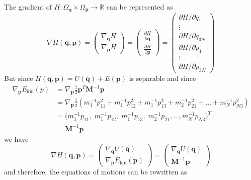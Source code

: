     The gradient of $H: \Omega_\mathbf{q} \times \Omega_\mathbf{p} \to \mathbb{R}$ can be represented as 
    \begin{equation}
      \nabla H(\mathbf{q}, \mathbf{p}) = 
      \begin{pmatrix} \nabla_\mathbf{q} H \\[1mm] \nabla_\mathbf{p} H \end{pmatrix} =
      \begin{pmatrix} \frac{\partial H}{\partial \mathbf{q}} \\[2mm] \frac{\partial H}{\partial \mathbf{p}} \end{pmatrix} = 
      \begin{pmatrix} \partial H / \partial q_1 \\ \vdots \\ \partial H / \partial q_{3N} \\ \partial H / \partial p_1 \\ \vdots \\ \partial H / \partial p_{3N} \end{pmatrix}
    \end{equation}
    But since $H(\mathbf{q}, \mathbf{p}) = U(\mathbf{q}) + E (\mathbf{p})$ is separable and since 
    \begin{align*}
      \nabla_\mathbf{p} E_\mathrm{kin}(p) & = \nabla_\mathbf{p} \frac{1}{2} \mathbf{p}^T \mathbf{M}^{-1} \mathbf{p} \\
      & = \nabla_\mathbf{p} \frac{1}{2} (m_1^{-1} p_{11}^2 + m_1^{-1} p_{12}^2 + m_1^{-1} p_{13}^2 + m_2^{-1} p_{21}^2 + \ldots + m_N^{-1} p_{N3}^2) \\
      & = \big(m_1^{-1} p_{11}, \;m_1^{-1} p_{12}, \;m_1^{-1} p_{13}, \;m_2^{-1} p_{21}, \ldots, m_N^{-1} p_{N3} \big)^T \\
      & = \mathbf{M}^{-1} \mathbf{p} 
    \end{align*}
    we have 
    \begin{equation}
      \nabla H(\mathbf{q}, \mathbf{p}) = \begin{pmatrix} \nabla_\mathbf{q} U (\mathbf{q})\\ \nabla_\mathbf{p} E_\mathrm{kin} (\mathbf{p}) \end{pmatrix} = \begin{pmatrix} \nabla_\mathbf{q} U (\mathbf{q})\\ \mathbf{M}^{-1} \mathbf{p} \end{pmatrix} 
    \end{equation}
    and therefore, the equations of motions can be rewritten as 
